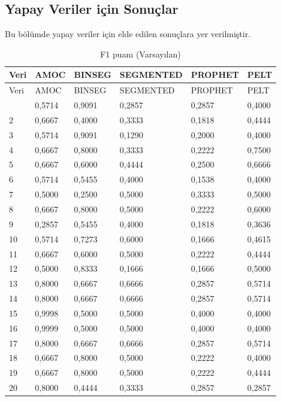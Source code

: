 \documentclass[12pt,twoside]{deuthesis}
\begin{document}
\hypertarget{yapay-veriler-iuxe7in-sonuuxe7lar}{%
\subsection{Yapay Veriler için Sonuçlar}\label{yapay-veriler-iuxe7in-sonuuxe7lar}}

Bu bölümde yapay veriler için elde edilen sonuçlara yer verilmiştir.

\begin{longtable}[]{@{}llllll@{}}
\caption{\label{tab:nvar8} F1 puanı (Varsayılan)}\tabularnewline
\toprule\noalign{}
Veri & AMOC & BINSEG & SEGMENTED & PROPHET & PELT \\
\midrule\noalign{}
\endfirsthead
\toprule\noalign{}
Veri & AMOC & BINSEG & SEGMENTED & PROPHET & PELT \\
\midrule\noalign{}
\endhead
\bottomrule\noalign{}
\endlastfoot
1 & 0,5714 & 0,9091 & 0,2857 & 0,2857 & 0,4000 \\
2 & 0,6667 & 0,4000 & 0,3333 & 0,1818 & 0,4444 \\
3 & 0,5714 & 0,9091 & 0,1290 & 0,2000 & 0,4000 \\
4 & 0,6667 & 0,8000 & 0,3333 & 0,2222 & 0,7500 \\
5 & 0,6667 & 0,6000 & 0,4444 & 0,2500 & 0,6666 \\
6 & 0,5714 & 0,5455 & 0,4000 & 0,1538 & 0,4000 \\
7 & 0,5000 & 0,2500 & 0,5000 & 0,3333 & 0,5000 \\
8 & 0,6667 & 0,8000 & 0,5000 & 0,2222 & 0,6000 \\
9 & 0,2857 & 0,5455 & 0,4000 & 0,1818 & 0,3636 \\
10 & 0,5714 & 0,7273 & 0,6000 & 0,1666 & 0,4615 \\
11 & 0,6667 & 0,6000 & 0,5000 & 0,2222 & 0,4444 \\
12 & 0,5000 & 0,8333 & 0,1666 & 0,1666 & 0,5000 \\
13 & 0,8000 & 0,6667 & 0,6666 & 0,2857 & 0,5714 \\
14 & 0,8000 & 0,6667 & 0,6666 & 0,2857 & 0,5714 \\
15 & 0,9998 & 0,5000 & 0,5000 & 0,4000 & 0,4000 \\
16 & 0,9999 & 0,5000 & 0,5000 & 0,4000 & 0,4000 \\
17 & 0,8000 & 0,6667 & 0,6666 & 0,2857 & 0,5714 \\
18 & 0,6667 & 0,8000 & 0,5000 & 0,2222 & 0,4000 \\
19 & 0,6667 & 0,8000 & 0,5000 & 0,2222 & 0,4444 \\
20 & 0,8000 & 0,4444 & 0,3333 & 0,2857 & 0,2857 \\
\end{longtable}
\end{document}
